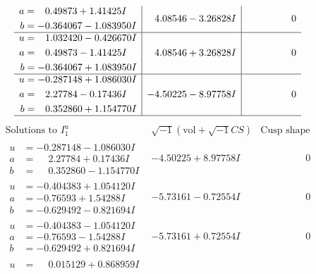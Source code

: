 \documentclass[1p]{elsarticle_modified}
\theoremstyle{definition}
\newcommand{\I}{\sqrt{-1}}
\begin{document}
$$\begin{array}{c|c|c}
\begin{aligned}
a &= \phantom{-}0.49873 + 1.41425 I \\
b &= -0.364067 - 1.083950 I\end{aligned}
 & \phantom{-}4.08546 - 3.26828 I & \phantom{-0.000000 } 0 \\ \hline\begin{aligned}
u &= \phantom{-}1.032420 - 0.426670 I \\
a &= \phantom{-}0.49873 - 1.41425 I \\
b &= -0.364067 + 1.083950 I\end{aligned}
 & \phantom{-}4.08546 + 3.26828 I & \phantom{-0.000000 } 0 \\ \hline\begin{aligned}
u &= -0.287148 + 1.086030 I \\
a &= \phantom{-}2.27784 - 0.17436 I \\
b &= \phantom{-}0.352860 + 1.154770 I\end{aligned}
 & -4.50225 - 8.97758 I & \phantom{-0.000000 } 0\\
 \hline 
 \end{array}$$\newpage$$\begin{array}{c|c|c}  
\text{Solutions to }I^u_{1}& \I (\text{vol} + \sqrt{-1}CS) & \text{Cusp shape}\\
 \hline 
\begin{aligned}
u &= -0.287148 - 1.086030 I \\
a &= \phantom{-}2.27784 + 0.17436 I \\
b &= \phantom{-}0.352860 - 1.154770 I\end{aligned}
 & -4.50225 + 8.97758 I & \phantom{-0.000000 } 0 \\ \hline\begin{aligned}
u &= -0.404383 + 1.054120 I \\
a &= -0.76593 + 1.54288 I \\
b &= -0.629492 - 0.821694 I\end{aligned}
 & -5.73161 - 0.72554 I & \phantom{-0.000000 } 0 \\ \hline\begin{aligned}
u &= -0.404383 - 1.054120 I \\
a &= -0.76593 - 1.54288 I \\
b &= -0.629492 + 0.821694 I\end{aligned}
 & -5.73161 + 0.72554 I & \phantom{-0.000000 } 0 \\ \hline\begin{aligned}
u &= \phantom{-}0.015129 + 0.868959 I \\

\end{aligned}
\end{array}$$
\end{document}
